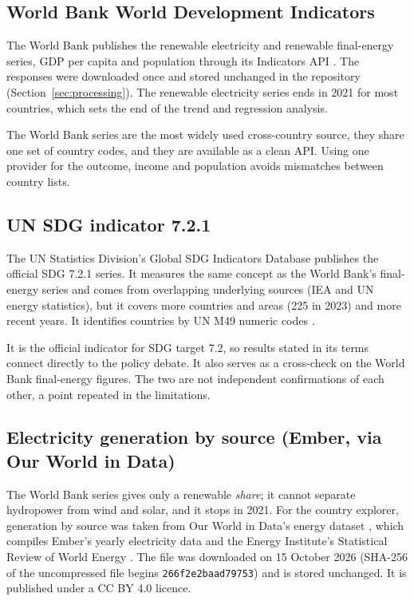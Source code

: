 \documentclass[11pt,a4paper]{article}
\newcommand{\code}[1]{\texttt{\small #1}}
\begin{document}
\subsection{World Bank World Development Indicators}
The World Bank publishes the renewable electricity and renewable final-energy series, GDP per capita and population through its Indicators API \citep{wb_api}. The responses were downloaded once and stored unchanged in the repository (Section~\ref{sec:processing}). The renewable electricity series ends in 2021 for most countries, which sets the end of the trend and regression analysis.

\begin{why}
The World Bank series are the most widely used cross-country source, they share one set of country codes, and they are available as a clean API. Using one provider for the outcome, income and population avoids mismatches between country lists.
\end{why}

\subsection{UN SDG indicator 7.2.1}
The UN Statistics Division's Global SDG Indicators Database \citep{un_sdg_db} publishes the official SDG 7.2.1 series. It measures the same concept as the World Bank's final-energy series and comes from overlapping underlying sources (IEA and UN energy statistics), but it covers more countries and areas (225 in 2023) and more recent years. It identifies countries by UN M49 numeric codes \citep{m49}.

\begin{why}
It is the official indicator for SDG target 7.2, so results stated in its terms connect directly to the policy debate. It also serves as a cross-check on the World Bank final-energy figures. The two are not independent confirmations of each other, a point repeated in the limitations.
\end{why}

\subsection{Electricity generation by source (Ember, via Our World in Data)}
The World Bank series gives only a renewable \emph{share}; it cannot separate hydropower from wind and solar, and it stops in 2021. For the country explorer, generation by source was taken from Our World in Data's energy dataset \citep{owid_energy,owid_energy_repo}, which compiles Ember's yearly electricity data \citep{ember} and the Energy Institute's Statistical Review of World Energy \citep{ei_review}. The file was downloaded on 15 October 2026 (SHA-256 of the uncompressed file begins \code{266f2e2baad79753}) and is stored unchanged. It is published under a CC BY 4.0 licence.
\end{document}
